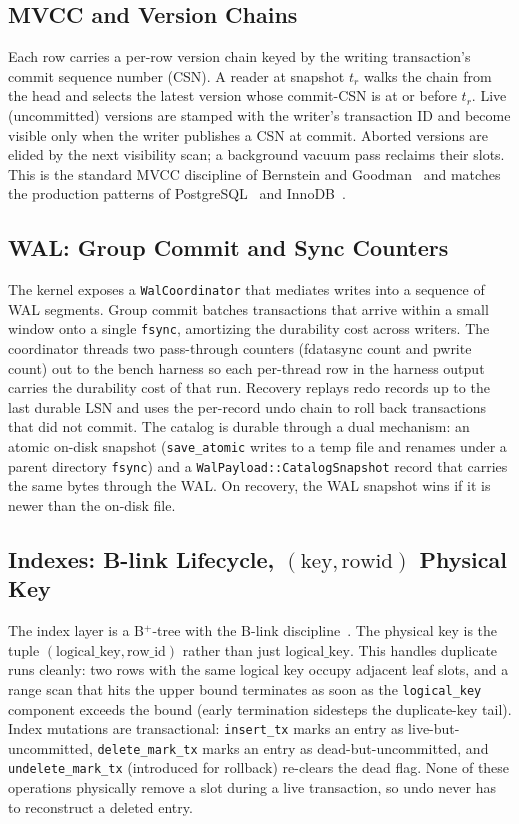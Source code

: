 \subsection{MVCC and Version Chains}
Each row carries a per-row version chain keyed by the writing
transaction's commit sequence number (CSN). A reader at snapshot
$t_r$ walks the chain from the head and selects the latest version
whose commit-CSN is at or before $t_r$. Live (uncommitted) versions
are stamped with the writer's transaction ID and become visible only
when the writer publishes a CSN at commit. Aborted versions are
elided by the next visibility scan; a background vacuum pass reclaims
their slots. This is the standard MVCC discipline of
Bernstein and Goodman~\cite{bernstein1983mvcc} and matches the
production patterns of PostgreSQL~\cite{postgresql_mvcc} and
InnoDB~\cite{innodb_mvcc}.

\subsection{WAL: Group Commit and Sync Counters}
The kernel exposes a \texttt{WalCoordinator} that mediates writes
into a sequence of WAL segments. Group commit batches transactions
that arrive within a small window onto a single \texttt{fsync},
amortizing the durability cost across writers. The coordinator
threads two pass-through counters (fdatasync count and pwrite count)
out to the bench harness so each per-thread row in the harness output
carries the durability cost of that run. Recovery replays redo
records up to the last durable LSN and uses the per-record undo
chain to roll back transactions that did not commit.
The catalog is durable through a dual mechanism: an atomic on-disk
snapshot (\texttt{save\_atomic} writes to a temp file and renames
under a parent directory \texttt{fsync}) and a
\texttt{WalPayload::CatalogSnapshot} record that carries the same
bytes through the WAL. On recovery, the WAL snapshot wins if it is
newer than the on-disk file.

\subsection{Indexes: B-link Lifecycle, $(\mathrm{key}, \mathrm{rowid})$ Physical Key}
The index layer is a B$^+$-tree with the
B-link discipline~\cite{lehman1981blink,srinivasan1991bplus}. The
physical key is the tuple $(\mathrm{logical\_key}, \mathrm{row\_id})$ rather
than just $\mathrm{logical\_key}$. This handles duplicate runs cleanly:
two rows with the same logical key occupy adjacent leaf slots, and a
range scan that hits the upper bound terminates as soon as the
\texttt{logical\_key} component exceeds the bound (early termination
sidesteps the duplicate-key tail). Index mutations are transactional:
\texttt{insert\_tx} marks an entry as live-but-uncommitted,
\texttt{delete\_mark\_tx} marks an entry as dead-but-uncommitted, and
\texttt{undelete\_mark\_tx} (introduced for rollback) re-clears the
dead flag. None of these operations physically remove a slot during a
live transaction, so undo never has to reconstruct a deleted entry.

